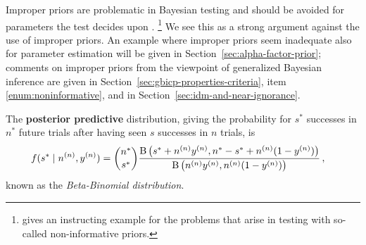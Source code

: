 Improper priors are problematic in Bayesian testing \parencite[\S 5.2.5]{2007:robert}
and should be avoided for parameters the test decides upon \parencite[p.~782]{1995:kass-raftery}.%
\footnote{\Textcite[\S 5.5.4 (j)]{1991:walley} gives an instructing example for the problems
that arise in testing with so-called non-informative priors.}
We see this as a strong argument against the use of improper priors.
An example where improper priors seem inadequate also for parameter estimation
will be given in Section~\ref{sec:alpha-factor-prior};
comments on improper priors from the viewpoint of generalized Bayesian inference
are given in Section~\ref{sec:gbicp-properties-criteria},
item \ref{enum:noninformative}, and in Section~\ref{sec:idm-and-near-ignorance}.

\iffalse
\cite[p.~235f]{2007:robert}
\begin{quote}
The difficulties encountered with noninformative priors in testing
also point out that a testing problem cannot be treated in a coherent way if no prior information is available,
that is, that the information brought by the observations alone is usually not enough
to infer about the truth of a hypothesis in categorical fashion (\emph{yes}/\emph{no}).
This obviously reinforces the the motivation for a Bayesian treatment of such testing problems,
since it is the only coherent approach taking advantage of the residual information.
\end{quote}
\fi




The \textbf{posterior predictive} distribution, giving the probability for $s^*$ successes in $n^*$ future trials
after having seen $s$ successes in $n$ trials, is
\begin{align*}
f(s^* \mid n^{(n)}, y^{(n)}) &= {n^* \choose s^*} \frac{\operatorname{B}\big(s^* + n^{(n)} y^{(n)}, n^* - s^* + n^{(n)} (1 - y^{(n)})\big)}{\operatorname{B}\big(n^{(n)}y^{(n)}, n^{(n)} (1 - y^{(n)})\big)}\,,
\end{align*}
known as the \emph{Beta-Binomial distribution}.



